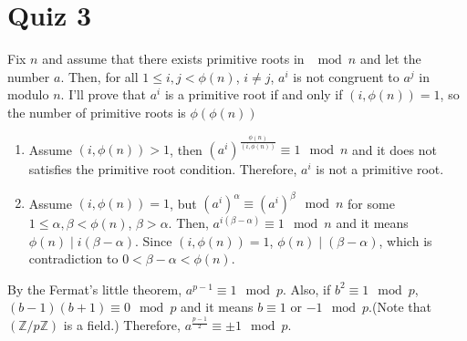 \documentclass[12pt]{article}
\newenvironment{problem}[2][Problem]{\begin{trivlist}
\item[\hskip \labelsep {\bfseries #1}\hskip \labelsep {\bfseries #2.}]}{\end{trivlist}}
\begin{document}




\section{Quiz 3}
\begin{problem}{1}
\end{problem}
Fix $n$ and assume that there exists primitive roots in $\mod n$ and let the number $a$. Then, for all $1\leq i,j< \phi(n)$, $i\neq j$, $a^i$ is not congruent to $a^j$ in modulo $n$. I'll prove that $a^i$ is a primitive root if and only if $(i, \phi(n))=1$, so the number of primitive roots is $\phi(\phi(n))$

\begin{enumerate}
    \item[($\Rightarrow$)] Assume $(i,\phi(n))>1$, then $(a^i)^{\frac{\phi(n)}{(i,\phi(n))}}\equiv 1 \mod n$ and it does not satisfies the primitive root condition. Therefore, $a^i$ is not a primitive root.
    \item[($\Leftarrow$)] Assume $(i, \phi(n))=1$, but $(a^i)^\alpha\equiv (a^i)^\beta \mod n$ for some $1\leq \alpha,\beta< \phi(n)$, $\beta>\alpha$. Then, $a^{i(\beta-\alpha)}\equiv 1 \mod n$ and it means $\phi(n)\mid i(\beta-\alpha)$. Since $(i,\phi(n))=1$, $\phi(n)\mid(\beta-\alpha)$, which is contradiction to $0<\beta-\alpha<\phi(n)$.
\end{enumerate}

\begin{problem}{2}
\end{problem}
By the Fermat's little theorem, $a^{p-1}\equiv 1 \mod p$. Also, if $b^2\equiv 1 \mod p$, $(b-1)(b+1)\equiv 0 \mod p$ and it means $b\equiv 1$ or $-1 \mod p$.(Note that $(\mathbb{Z}/p\mathbb{Z})$ is a field.) Therefore, $a^{\frac{p-1}{2}}\equiv \pm 1 \mod p$.
\end{document}
